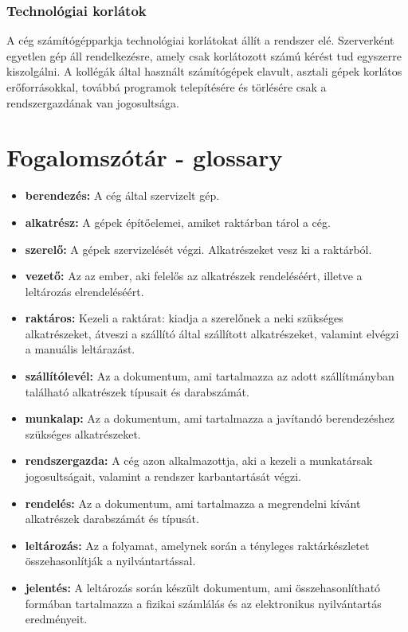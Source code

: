 \documentclass[12pt]{article}\usepackage[left=20mm,right=20mm,top=15mm,bottom=20mm]{geometry}
\begin{document}
\subsubsection{Technológiai korlátok}
A cég számítógépparkja technológiai korlátokat állít a rendszer elé.
Szerverként egyetlen gép áll rendelkezésre, amely csak korlátozott számú kérést tud egyszerre kiszolgálni. 
A kollégák által használt számítógépek elavult, asztali gépek korlátos erőforrásokkal, továbbá programok telepítésére és törlésére csak a rendszergazdának van jogosultsága.

\section{Fogalomszótár - glossary}
\begin{itemize}
\item[]\textbf{berendezés: } A cég által szervizelt gép.

\item[]\textbf{alkatrész: } A gépek építőelemei, amiket raktárban tárol a cég. 

\item[]\textbf{szerelő: } A gépek szervizelését végzi. Alkatrészeket vesz ki a raktárból.

\item[]\textbf{vezető: } Az az ember, aki felelős az alkatrészek rendeléséért, illetve a leltározás elrendeléséért.

\item[]\textbf{raktáros: } Kezeli a raktárat: kiadja a szerelőnek a neki szükséges alkatrészeket, átveszi a szállító által szállított alkatrészeket, valamint elvégzi a manuális leltárazást.

\item[]\textbf{szállítólevél: } Az a dokumentum, ami tartalmazza az adott szállítmányban található alkatrészek típusait és darabszámát.

\item[]\textbf{munkalap: } Az a dokumentum, ami tartalmazza a javítandó berendezéshez szükséges alkatrészeket. 

\item[]\textbf{rendszergazda: } A cég azon alkalmazottja, aki a kezeli a munkatársak jogosultságait, valamint a rendszer karbantartását végzi.

\item[]\textbf{rendelés: } Az a dokumentum, ami tartalmazza a megrendelni kívánt alkatrészek darabszámát és típusát.

\item[]\textbf{leltározás: } Az a folyamat, amelynek során a tényleges raktárkészletet összehasonlítják a nyilvántartással.

\item[]\textbf{jelentés: } A leltározás során készült dokumentum, ami összehasonlítható formában tartalmazza a fizikai számlálás és az elektronikus nyilvántartás eredményeit.
\end{itemize}
\end{document}
